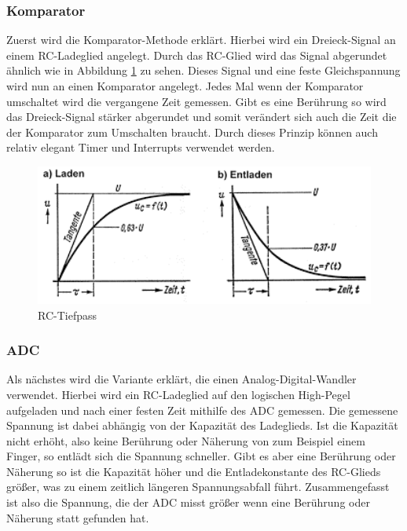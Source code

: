 \documentclass[a4paper,
DIV=13,
12pt,
BCOR=10mm,
department=FakEI,
parskip=half,
automark,
]{article}
\begin{document}
\subsubsection{Komparator}
Zuerst wird die Komparator-Methode erklärt. Hierbei wird ein Dreieck-Signal an einem RC-Ladeglied angelegt. Durch das RC-Glied wird das Signal abgerundet ähnlich wie in Abbildung \ref{fig:Tiefpass} zu sehen. Dieses Signal und eine feste Gleichspannung wird nun an einen Komparator angelegt. Jedes Mal wenn der Komparator umschaltet wird die vergangene Zeit gemessen. Gibt es eine Berührung so wird das Dreieck-Signal stärker abgerundet und somit verändert sich auch die Zeit die der Komparator zum Umschalten braucht. Durch dieses Prinzip können auch relativ elegant Timer und Interrupts verwendet werden. 
\begin{figure}[!hbpt]
 \begin{center} \includegraphics[width=1\textwidth]{RCTiefpass.png}
 \caption{RC-Tiefpass}
 \label{fig:Tiefpass}
  \end{center}
\end{figure}

\subsubsection{ADC}
Als nächstes wird die Variante erklärt, die einen Analog-Digital-Wandler verwendet. Hierbei wird ein RC-Ladeglied auf den logischen High-Pegel aufgeladen und nach einer festen Zeit mithilfe des ADC gemessen. Die gemessene Spannung ist dabei abhängig von der Kapazität des Ladeglieds. Ist die Kapazität nicht erhöht, also keine Berührung oder Näherung von zum Beispiel einem Finger, so entlädt sich die Spannung schneller. Gibt es aber eine Berührung oder Näherung so ist die Kapazität höher und die Entladekonstante des RC-Glieds größer, was zu einem zeitlich längeren Spannungsabfall führt. Zusammengefasst ist also die Spannung, die der ADC misst größer wenn eine Berührung oder Näherung statt gefunden hat. 
\end{document}
